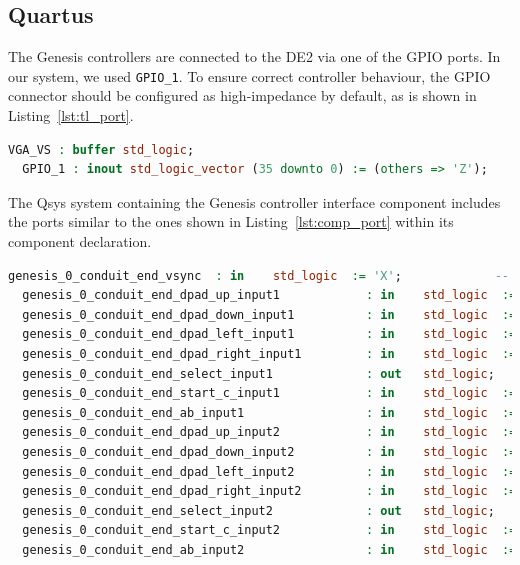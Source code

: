 \documentclass{capstonedoc}
\begin{document}
\subsection{Quartus}

The Genesis controllers are connected to the DE2 via one of the GPIO ports. In
our system, we used \texttt{GPIO\_1}. To ensure correct controller behaviour,
the GPIO connector should be configured as high-impedance by default, as is
shown in Listing~\ref{lst:tl_port}.

\begin{lstlisting}[language={vhdl},caption={Entity Port for Genesis Controllers},label={lst:tl_port}]
  VGA_VS : buffer std_logic;
  GPIO_1 : inout std_logic_vector (35 downto 0) := (others => 'Z');
\end{lstlisting}

The Qsys system containing the Genesis controller interface component includes
the ports similar to the ones shown in Listing~\ref{lst:comp_port} within its
component declaration.

\begin{lstlisting}[language={vhdl},caption={Qsys System Ports for Genesis Controller},label={lst:comp_port}]
  genesis_0_conduit_end_vsync  : in    std_logic  := 'X';             -- trigger signal, usually vsync
  genesis_0_conduit_end_dpad_up_input1            : in    std_logic  := 'X';             -- dpad_up_input1
  genesis_0_conduit_end_dpad_down_input1          : in    std_logic  := 'X';             -- dpad_down_input1
  genesis_0_conduit_end_dpad_left_input1          : in    std_logic  := 'X';             -- dpad_left_input1
  genesis_0_conduit_end_dpad_right_input1         : in    std_logic  := 'X';             -- dpad_right_input1
  genesis_0_conduit_end_select_input1             : out   std_logic;                     -- select_input1
  genesis_0_conduit_end_start_c_input1            : in    std_logic  := 'X';             -- start_c_input1
  genesis_0_conduit_end_ab_input1                 : in    std_logic  := 'X';             -- ab_input1
  genesis_0_conduit_end_dpad_up_input2            : in    std_logic  := 'X';             -- dpad_up_input2
  genesis_0_conduit_end_dpad_down_input2          : in    std_logic  := 'X';             -- dpad_down_input2
  genesis_0_conduit_end_dpad_left_input2          : in    std_logic  := 'X';             -- dpad_left_input2
  genesis_0_conduit_end_dpad_right_input2         : in    std_logic  := 'X';             -- dpad_right_input2
  genesis_0_conduit_end_select_input2             : out   std_logic;                     -- select_input2
  genesis_0_conduit_end_start_c_input2            : in    std_logic  := 'X';             -- start_c_input2
  genesis_0_conduit_end_ab_input2                 : in    std_logic  := 'X';             -- ab_input2
\end{lstlisting}
\end{document}
